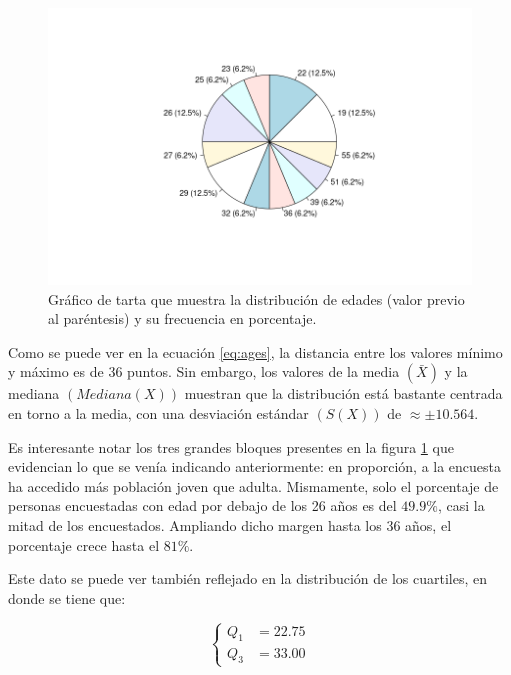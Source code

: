 \begin{figure}[H]
  \centering
  \includegraphics[width=\linewidth]{images/ages-pie.png}
  \caption{Gráfico de tarta que muestra la distribución de edades (valor previo al paréntesis) y su frecuencia en porcentaje.}
  \label{fig:ages}
\end{figure}

Como se puede ver en la ecuación \ref{eq:ages}, la distancia entre los valores
mínimo y máximo es de $36$ puntos. Sin embargo, los valores de la media $\left(\bar{X}\right)$
y la mediana $\left(Mediana\left(X\right)\right)$ muestran que la distribución está
bastante centrada en torno a la media, con una desviación estándar $\left(S\left(X\right)\right)$
de $\approx\pm10.564$.

Es interesante notar los tres grandes bloques presentes en la figura \ref{fig:ages}
que evidencian lo que se venía indicando anteriormente: en proporción, a la encuesta
ha accedido más población joven que adulta. Mismamente, solo el porcentaje de personas
encuestadas con edad por debajo de los 26 años es del $49.9\%$, casi la mitad de
los encuestados. Ampliando dicho margen hasta los 36 años, el porcentaje crece hasta
el $81 \%$.

Este dato se puede ver también reflejado en la distribución de los cuartiles, en donde
se tiene que:

\begin{equation}\label{eq:age-quartiles}
  \left\{
  \begin{aligned}
    Q_1 & = 22.75 \\
    Q_3 & = 33.00
  \end{aligned}
  \right.
\end{equation}

